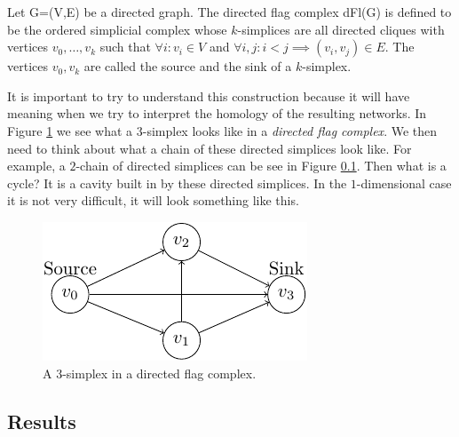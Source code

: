 \begin{definition}
  Let G=(V,E) be a directed graph. The directed flag complex dFl(G) is defined to be the ordered simplicial complex whose $k$-simplices are all directed cliques with vertices $v_{0},\dots,v_{k}$ such that $\forall i: v_{i} \in V$
  and $\forall i,j: i < j \implies (v_{i}, v_{j}) \in E$. The vertices $v_{0}, v_{k}$ are called the source and the sink of a $k$-simplex.
\end{definition}

It is important to try to understand this construction because it will have meaning when we try to interpret the homology of the resulting networks. In Figure \ref{disimplex} we see what a $3$-simplex looks like in a \textit{directed flag complex}. We then need to think about what a chain of these directed simplices look like. For example, a $2$-chain of directed simplices can be see in Figure \ref{}. Then what is a cycle? It is a cavity built in by these directed simplices. In the $1$-dimensional case it is not very difficult, it will look something like this.

\begin{figure}[ht]
  \centering
  \includegraphics[]{./counts/3simplex.pdf}
  \caption{\label{disimplex} A 3-simplex in a directed flag complex.}
\end{figure}
\subsection{Results}


